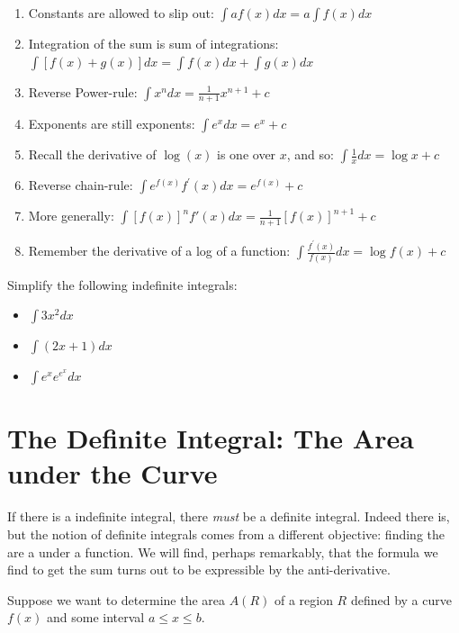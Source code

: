 \documentclass[]{book}
\providecommand{\tightlist}{%
  \setlength{\itemsep}{0pt}\setlength{\parskip}{0pt}}
\theoremstyle{definition}
\theoremstyle{definition}
\theoremstyle{definition}
\theoremstyle{remark}
\let\BeginKnitrBlock\begin \let\EndKnitrBlock\end
\begin{document}
\begin{enumerate}
\def\labelenumi{\arabic{enumi}.}
\tightlist
\item
  Constants are allowed to slip out: \(\int a f(x)dx = a\int f(x)dx\)
\item
  Integration of the sum is sum of integrations: \(\int [f(x)+g(x)]dx=\int f(x)dx + \int g(x)dx\)
\item
  Reverse Power-rule: \(\int x^n dx = \frac{1}{n+1} x^{n+1} + c\)
\item
  Exponents are still exponents: \(\int e^x dx = e^x +c\)
\item
  Recall the derivative of \(\log(x)\) is one over \(x\), and so: \(\int \frac{1}{x} dx = \log x + c\)
\item
  Reverse chain-rule: \(\int e^{f(x)}f^\prime(x)dx = e^{f(x)}+c\)
\item
  More generally: \(\int [f(x)]^n f'(x)dx = \frac{1}{n+1}[f(x)]^{n+1}+c\)
\item
  Remember the derivative of a log of a function: \(\int \frac{f^\prime(x)}{f(x)}dx=\log f(x) + c\)
\end{enumerate}

\BeginKnitrBlock{example}[Common Integration]
\protect\hypertarget{exm:unnamed-chunk-25}{}{\label{exm:unnamed-chunk-25} {} }Simplify the following indefinite integrals:

\begin{itemize}
\tightlist
\item
  \(\int 3x^2 dx\)
\item
  \(\int (2x+1)dx\)
\item
  \(\int e^x e^{e^x} dx\)
\end{itemize}
\EndKnitrBlock{example}

\hypertarget{the-definite-integral-the-area-under-the-curve}{%
\section{The Definite Integral: The Area under the Curve}\label{the-definite-integral-the-area-under-the-curve}}

If there is a indefinite integral, there \emph{must} be a definite integral. Indeed there is, but the notion of definite integrals comes from a different objective: finding the are a under a function. We will find, perhaps remarkably, that the formula we find to get the sum turns out to be expressible by the anti-derivative.

Suppose we want to determine the area \(A(R)\) of a region \(R\) defined by a curve \(f(x)\) and some interval \(a\le x \le b\).
\end{document}
